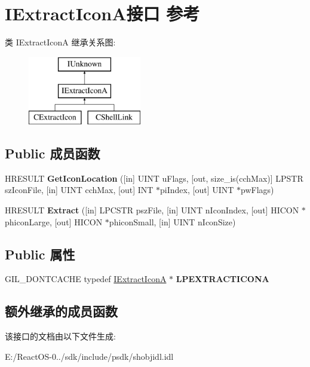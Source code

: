 \hypertarget{interface_i_extract_icon_a}{}\section{I\+Extract\+Icon\+A接口 参考}
\label{interface_i_extract_icon_a}
类 I\+Extract\+IconA 继承关系图\+:\begin{figure}[H]
\begin{center}
\leavevmode
\includegraphics[height=3.000000cm]{interface_i_extract_icon_a}
\end{center}
\end{figure}
\subsection*{Public 成员函数}
\begin{DoxyCompactItemize}
\item 
\mbox{\label{interface_i_extract_icon_a_a79727c274d51d6294f29650d8a59797a}} 
H\+R\+E\+S\+U\+LT {\bfseries Get\+Icon\+Location} (\mbox{[}in\mbox{]} U\+I\+NT u\+Flags, \mbox{[}out, size\+\_\+is(cch\+Max)\mbox{]} L\+P\+S\+TR sz\+Icon\+File, \mbox{[}in\mbox{]} U\+I\+NT cch\+Max, \mbox{[}out\mbox{]} I\+NT $\ast$pi\+Index, \mbox{[}out\mbox{]} U\+I\+NT $\ast$pw\+Flags)
\item 
\mbox{\label{interface_i_extract_icon_a_afc23351b2717f97b6525535b3b7c9a9e}} 
H\+R\+E\+S\+U\+LT {\bfseries Extract} (\mbox{[}in\mbox{]} L\+P\+C\+S\+TR psz\+File, \mbox{[}in\mbox{]} U\+I\+NT n\+Icon\+Index, \mbox{[}out\mbox{]} H\+I\+C\+ON $\ast$phicon\+Large, \mbox{[}out\mbox{]} H\+I\+C\+ON $\ast$phicon\+Small, \mbox{[}in\mbox{]} U\+I\+NT n\+Icon\+Size)
\end{DoxyCompactItemize}
\subsection*{Public 属性}
\begin{DoxyCompactItemize}
\item 
\mbox{\label{interface_i_extract_icon_a_a5169b414bef4ed1b2c840d442aac0e17}} 
G\+I\+L\+\_\+\+D\+O\+N\+T\+C\+A\+C\+HE typedef \hyperlink{interface_i_extract_icon_a}{I\+Extract\+IconA} $\ast$ {\bfseries L\+P\+E\+X\+T\+R\+A\+C\+T\+I\+C\+O\+NA}
\end{DoxyCompactItemize}
\subsection*{额外继承的成员函数}


该接口的文档由以下文件生成\+:\begin{DoxyCompactItemize}
\item 
E\+:/\+React\+O\+S-\/0../sdk/include/psdk/shobjidl.\+idl\end{DoxyCompactItemize}
